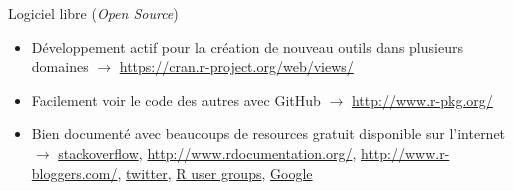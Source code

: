 \documentclass[11pt]{beamer}\usepackage[]{graphicx}\usepackage[]{color}
\begin{document}
\begin{frame}{Logiciel libre (\textit{Open Source})}

\begin{itemize}
  \setlength\itemsep{2em}
\item D\'{e}veloppement actif pour la cr\'{e}ation de nouveau outils dans plusieurs domaines $\rightarrow$ \href{https://cran.r-project.org/web/views/}{https://cran.r-project.org/web/views/} 
\item Facilement voir le code des autres avec GitHub $\rightarrow$ \href{http://www.r-pkg.org/}{http://www.r-pkg.org/}
\item Bien document\'{e} avec beaucoups de resources gratuit disponible sur l'internet $\rightarrow$ \href{http://stackoverflow.com/questions/tagged/r}{stackoverflow},  \href{http://www.rdocumentation.org/}{http://www.rdocumentation.org/}, \href{http://www.r-bloggers.com/}{http://www.r-bloggers.com/}, \href{https://twitter.com/search?q=\%23rstats}{twitter}, \href{http://blog.revolutionanalytics.com/local-r-groups.html}{R user groups}, 
\href{https://www.google.ca/}{Google}
\end{itemize}


\end{frame}
\end{document}
